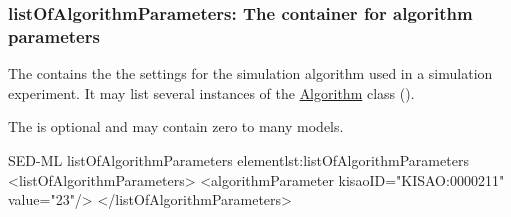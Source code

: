 
\subsubsection{listOfAlgorithmParameters: The container for algorithm parameters}
\label{sec:listOfAlgorithmParameters}

The  contains the the settings for the simulation algorithm used in a simulation experiment. It may list several instances of the \hyperref[class:algorithm]{Algorithm} class ().

%
The  is optional and may contain zero to many models. 
%
\begin{myXmlLst}{SED-ML listOfAlgorithmParameters element}{lst:listOfAlgorithmParameters}
<listOfAlgorithmParameters>
 <algorithmParameter kisaoID="KISAO:0000211" value="23"/> 
</listOfAlgorithmParameters>
\end{myXmlLst}
%

